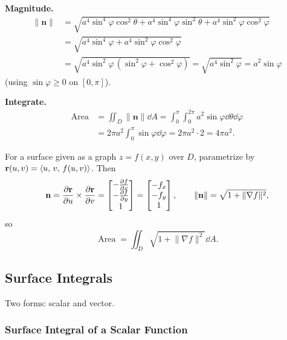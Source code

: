 \begin{example}
  \textbf{Magnitude.}
  \begin{align*}
    \lVert\mathbf{n}\rVert
     & = \sqrt{a^4\sin^4\varphi\cos^2\theta + a^4\sin^4\varphi\sin^2\theta + a^4\sin^2\varphi\cos^2\varphi} \\
     & = \sqrt{a^4\sin^4\varphi + a^4\sin^2\varphi\cos^2\varphi}                                            \\
     & = \sqrt{a^4\sin^2\varphi\,(\sin^2\varphi+\cos^2\varphi)}
    = \sqrt{a^4\sin^2\varphi}
    = a^2\sin\varphi
  \end{align*}
  (using $\sin\varphi\geq 0$ on $[0,\pi]$).

  \textbf{Integrate.}
  \begin{align*}
    \operatorname{Area}
     & = \iint_D \lVert\mathbf{n}\rVert\dd{A}
    = \int_0^{\pi}\!\int_0^{2\pi} a^2\sin\varphi\dd{\theta}\dd{\varphi} \\
     & = 2\pi a^2\int_0^{\pi}\sin\varphi\dd{\varphi}
    = 2\pi a^2\cdot 2 = 4\pi a^2.
  \end{align*}
\end{example}

\begin{note}
  For a surface given as a graph $z = f(x,y)$ over $D$, parametrize by $\mathbf{r}(u,v) = \langle u,\,v,\,f(u,v) \rangle$. Then
  \[
    \mathbf{n} = \frac{\partial \mathbf{r}}{\partial u}\times\frac{\partial \mathbf{r}}{\partial v}
    =
    \begin{bmatrix}
      -\frac{\partial f}{\partial x} \\ -\frac{\partial f}{\partial y} \\ 1
    \end{bmatrix}
    =
    \begin{bmatrix}
      -f_x \\ -f_y \\ 1
    \end{bmatrix}
    ,\qquad
    \lVert\mathbf{n}\rVert = \sqrt{1+\lVert\nabla f\rVert^2},
  \]
  so
  \[
    \operatorname{Area} = \iint_D \sqrt{1+\lVert\nabla f\rVert^2}\dd{A}.
  \]
\end{note}

\subsection{Surface Integrals}

Two forms: scalar and vector.

\subsubsection{Surface Integral of a Scalar Function}

